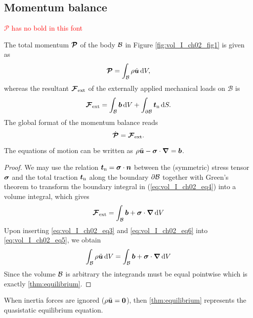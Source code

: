 \subsection{Momentum balance}
\textcolor{red}{$\mathcal{P}$ has no bold in this font}

The total momentum $\bm{\mathcal{P}}$ of the body $\mathcal{B}$ in Figure
\ref{fig:vol_I_ch02_fig1} is given as
\begin{equation}
  \bm{\mathcal{P}} = \int_{\mathcal{B}} \rho \dot{\bm {u}} \mathop{}\!\mathrm{d} V,
  \label{eq:vol_I_ch02_eq3}
\end{equation}
whereas the resultant $\bm{\mathcal{F}}_{\mathrm{ext}}$ of the externally
applied mechanical loads on $\mathcal{B}$ is
\begin{equation}
  \bm{\mathcal{F}}_{\mathrm{ext}} =\int_{\mathcal{B}} \bm{b} \mathop{}\!\mathrm{d} V + \int_{\partial \mathcal{B}} \bm{t}_{\mathrm{n}} \mathop{}\!\mathrm{d} S.
    \label{eq:vol_I_ch02_eq4}
\end{equation}
The global format of the momentum balance reads
\begin{equation}
  \dot{\bm{\mathcal{P}}}= \bm{\mathcal{F}}_{\mathrm{ext}}.
     \label{eq:vol_I_ch02_eq5}
\end{equation}

\begin{theorem} \label{thm:equilibrium}
The equations of motion can be written as 
 $\rho \ddot{\bm {u}} - \bm{\sigma} \cdot {\bm\nabla} = \bm{b}$. 
\end{theorem}
\begin{proof}
We may use the relation $\bm{t}_{\mathrm{n}} = \bm{\sigma} \cdot \bm{n}$
between the (symmetric) stress tensor $\bm{\sigma}$ and the total traction
$\bm{t}_{\mathrm{n}}$ along the boundary $\partial \mathcal{B}$ together with
Green's theorem to transform the boundary integral in
(\ref{eq:vol_I_ch02_eq4}) into a volume integral, which gives
\begin{equation}
  \bm{\mathcal{F}}_{\mathrm{ext}} = \int_{\mathcal{B}} \bm{b} + \bm{\sigma} \cdot {\bm\nabla} \mathop{}\!\mathrm{d} V
     \label{eq:vol_I_ch02_eq6}
\end{equation}
Upon inserting \eqref{eq:vol_I_ch02_eq3} and
\eqref{eq:vol_I_ch02_eq6} into \eqref{eq:vol_I_ch02_eq5}, we obtain
\begin{equation}
   \int_{\mathcal{B}} \rho \ddot{\bm {u}} \mathop{}\!\mathrm{d} V = \int_{\mathcal{B}}  \bm{b} + \bm{\sigma} \cdot {\bm\nabla} \mathop{}\!\mathrm{d} V
  \label{eq:vol_I_ch02_eq7}
\end{equation}
Since the volume $\mathcal{B}$ is arbitrary the integrands must be equal pointwise
which is exactly \ref{thm:equilibrium}.
\end{proof}
\begin{remark}
When inertia forces are ignored ($\rho \ddot{\bm {u}} = \bm{0}$), then
\ref{thm:equilibrium} represents the quasistatic equilibrium
equation.
\end{remark}

